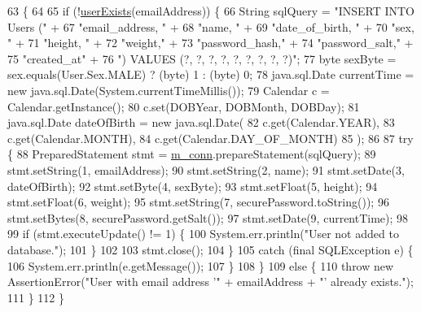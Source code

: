 \begin{DoxyCode}
63                                                                                                         \{
64 
65         \textcolor{keywordflow}{if} (!\hyperlink{classcom_1_1activitytracker_1_1_d_b_manager_af05d79f33ecf2920a67d1b9cf82c079f}{userExists}(emailAddress)) \{
66             String sqlQuery = \textcolor{stringliteral}{"INSERT INTO Users ("} +
67                     \textcolor{stringliteral}{"email\_address, "} +
68                     \textcolor{stringliteral}{"name, "} +
69                     \textcolor{stringliteral}{"date\_of\_birth, "} +
70                     \textcolor{stringliteral}{"sex, "} +
71                     \textcolor{stringliteral}{"height, "} +
72                     \textcolor{stringliteral}{"weight,"} +
73                     \textcolor{stringliteral}{"password\_hash,"} +
74                     \textcolor{stringliteral}{"password\_salt,"} +
75                     \textcolor{stringliteral}{"created\_at"} +
76                     \textcolor{stringliteral}{") VALUES (?, ?, ?, ?, ?, ?, ?, ?, ?)"};
77             byte sexByte = sex.equals(User.Sex.MALE) ? (byte) 1 : (byte) 0;
78             java.sql.Date currentTime = \textcolor{keyword}{new} java.sql.Date(System.currentTimeMillis());
79             Calendar c = Calendar.getInstance();
80             c.set(DOBYear, DOBMonth, DOBDay);
81             java.sql.Date dateOfBirth = \textcolor{keyword}{new} java.sql.Date(
82                     c.get(Calendar.YEAR),
83                     c.get(Calendar.MONTH),
84                     c.get(Calendar.DAY\_OF\_MONTH)
85             );
86 
87             \textcolor{keywordflow}{try} \{
88                 PreparedStatement stmt = \hyperlink{classcom_1_1activitytracker_1_1_d_b_manager_a064088d13ac09eb147fdc19268771521}{m\_conn}.prepareStatement(sqlQuery);
89                 stmt.setString(1, emailAddress);
90                 stmt.setString(2, name);
91                 stmt.setDate(3, dateOfBirth);
92                 stmt.setByte(4, sexByte);
93                 stmt.setFloat(5, height);
94                 stmt.setFloat(6, weight);
95                 stmt.setString(7, securePassword.toString());
96                 stmt.setBytes(8, securePassword.getSalt());
97                 stmt.setDate(9, currentTime);
98 
99                 \textcolor{keywordflow}{if} (stmt.executeUpdate() != 1) \{
100                     System.err.println(\textcolor{stringliteral}{"User not added to database."});
101                 \}
102 
103                 stmt.close();
104             \}
105             \textcolor{keywordflow}{catch} (\textcolor{keyword}{final} SQLException e) \{
106                 System.err.println(e.getMessage());
107             \}
108         \}
109         \textcolor{keywordflow}{else} \{
110             \textcolor{keywordflow}{throw} \textcolor{keyword}{new} AssertionError(\textcolor{stringliteral}{"User with email address '"} + emailAddress + \textcolor{stringliteral}{"' already exists."});
111         \}
112     \}
\end{DoxyCode}

